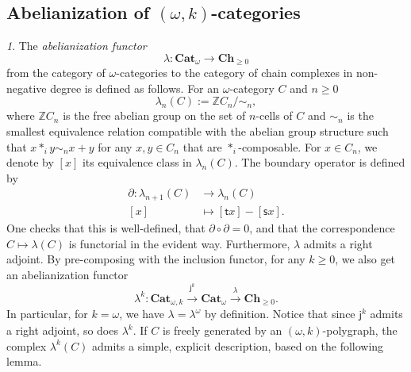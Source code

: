 \documentclass[reqno]{amsart}
\theoremstyle{plain}
\theoremstyle{definition}
\theoremstyle{remark}
\newtheorem{paragr}[subsubsection]{} %
\newcommand{\nmbr}[1]{\mathbb #1}
\newcommand{\Z}{\nmbr{Z}}
\newcommand{\pair}[2]{(#1,#2)}       %
\newcommand{\source}{\mathsf{s}} %
\newcommand{\target}{\mathsf{t}} %
\newcommand{\ctg}[1]{\mathbf{#1}}  %
\newcommand{\Cat}{\ctg{Cat}}   %
\newcommand{\nCat}[1]{\Cat_{#1}}  %
\newcommand{\opCat}[1]{\Cat_{\omega,#1}} %
\newcommand{\oCat}{\nCat{\omega}} %
\newcommand{\Ch}[1]{\ctg{Ch}_{#1}} %
\newcommand{\Chp}{\Ch{\geq 0}} %
\newcommand{\functor}[1]{\mathsf{#1}} %
\newcommand{\emb}[2]{\functor{j}_{#2}^{#1}}%
\newcommand{\oemb}[1]{\emb{#1}{}}%
\newcommand{\abel}{\functor{\lambda}} %
\newcommand{\abelk}[1]{\functor{\abel}^{#1}}%
\newcommand{\comp}[1]{\ast_{#1}} %
\newcommand{\oo}{\ensuremath{\omega}}
\newcommand{\ook}[1]{\ensuremath{\pair{\omega}{#1}}}
\newcommand{\nbd}{\nobreakdash} %
\begin{document}
\subsection{Abelianization of \texorpdfstring{$\ook k$}{(ω,k)}-categories}\label{subsec:abel}
\begin{paragr}
  The {\em abelianization functor}
  \[\abel\colon\oCat \to \Chp \]
  from the category of $\oo$\nbd-categories to
  the category of chain complexes in non-negative degree is defined as follows. For an $\oo$\nbd-category $C$ and $n\geq 0$
  \[
    \abel_n(C):=\Z C_n/\sim_n,
  \]
  where $\Z C_n$ is the free abelian group on the set of $n$\nbd-cells
  of $C$ and $\sim_n$ is the smallest equivalence relation compatible with
  the abelian group structure such that $x\comp{i} y
  \sim _n x + y$ for any $x,y\in C_n$ that are
  $\comp{i}$-composable. For $x\in C_n$, we denote by $[x]$ its
  equivalence class in $\abel_n(C)$. The boundary operator is defined by
  \[
    \begin{aligned}
      \partial \colon \abel_{n+1}(C) &\to \abel_{n}(C)\\
      [x] &\mapsto [\target x] - [\source x].
    \end{aligned}
  \]
  One checks that this is well-defined, that $\partial
  \circ \partial=0$, and that the correspondence $C \mapsto
  \abel(C)$ is functorial in the evident
  way. Furthermore, $\abel$ admits a right adjoint. 
  By pre-composing with the inclusion functor, for any $k\geq 0$, we
  also get an abelianization functor
  \[
    \abelk{k} \colon \opCat{k} \overset{\oemb{k}}{\longrightarrow} \oCat \overset{\abel}{\longrightarrow} \Chp.
  \]
  In particular, for $k=\oo$, we have $\abel=\abelk{\oo}$ by
  definition. Notice that since $\oemb{k}$ admits a right adjoint, so
  does $\abelk{k}$.
  If $C$ is freely generated by an \ook k-polygraph, the complex
  $\abelk k(C)$ admits a simple, explicit description, based on the following
lemma.
\end{paragr}
\end{document}
